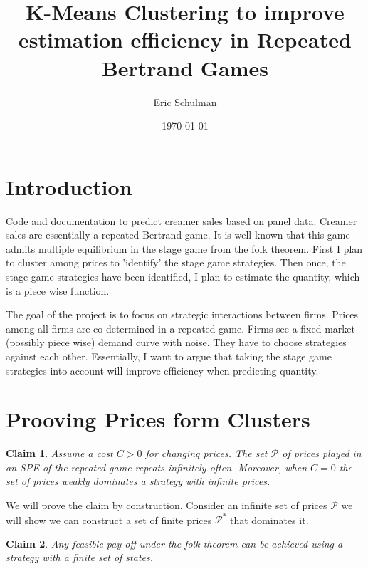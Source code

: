 \documentclass{article}
\title{K-Means Clustering to improve estimation efficiency in Repeated Bertrand Games}
\author{Eric Schulman}
\date{\today}
\newtheorem{claim}{Claim}
\begin{document}
\maketitle

\section{Introduction}

Code and documentation to predict creamer sales based on panel data. Creamer sales are essentially a repeated Bertrand game. It is well known that this game admits multiple equilibrium in the stage game from the folk theorem. First I plan to cluster among prices to 'identify' the stage game strategies. Then once, the stage game strategies have been identified, I plan to estimate the quantity, which is a piece wise function. 


The goal of the project is to focus on strategic interactions between firms. Prices among all firms are co-determined in a repeated game. Firms see a fixed market (possibly piece wise) demand curve with noise. They have to choose strategies against each other. Essentially, I want to argue that taking the stage game strategies into account will improve efficiency when predicting quantity.




\section{Prooving Prices form Clusters}




\begin{claim}
Assume a cost $C>0$ for changing prices. The set $\mathcal{P}$ of prices played in an SPE of the repeated game repeats infinitely often. Moreover, when $C=0$ the set of prices weakly dominates a strategy with infinite prices.
\end{claim}

We will prove the claim by construction. Consider an infinite set of prices $\mathcal{P}$ we will show we can construct a set of finite prices $\mathcal{P}^*$ that dominates it.  

\begin{claim}
Any feasible pay-off under the folk theorem can be achieved using a strategy with a finite set of states.
\end{claim}
\end{document}
